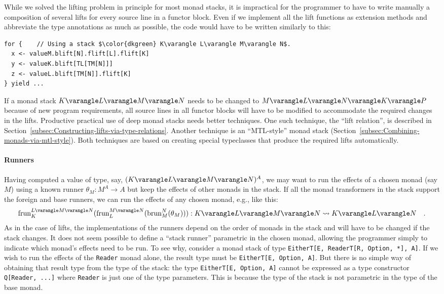While we solved the lifting problem in principle for most monad stacks,
it is impractical for the programmer to have to write manually a composition
of several lifts for every source line in a functor block. Even if
we implement all the lift functions as extension methods and abbreviate
the type annotations as much as possible, the code would have to be
written similarly to this:
\begin{lstlisting}[mathescape=true]
for {    // Using a stack $\color{dkgreen} K\varangle L\varangle M\varangle N$.
  x <- valueM.blift[N].flift[L].flift[K]
  y <- valueK.blift[TL[TM[N]]]
  z <- valueL.blift[TM[N]].flift[K]
} yield ...
\end{lstlisting}
If a monad stack $K\varangle L\varangle M\varangle N$ needs to be
changed to $M\varangle L\varangle N\varangle K\varangle P$ because
of new program requirements, all source lines in all functor blocks
will have to be modified to accommodate the required changes in the
lifts. Productive practical use of deep monad stacks needs better
techniques. One such technique, the \textsf{``}lift relation\textsf{''}, is described
in Section~\ref{subsec:Constructing-lifts-via-type-relations}. Another
technique is an \textsf{``}MTL-style\textsf{''} monad stack (Section~\ref{subsec:Combining-monads-via-mtl-style}).
Both techniques are based on creating special typeclasses that produce
the required lifts automatically.

\paragraph{Runners}

Having computed a value of type, say, $(K\varangle L\varangle M\varangle N)^{A}$,
we may want to run the effects of a chosen monad (say $M$) using
a known runner $\theta_{M}:M^{A}\rightarrow A$ but keep the effects
of other monads in the stack. If all the monad transformers in the
stack support the foreign and base runners, we can run the effects
of any chosen monad, e.g., like this:
\[
\text{frun}_{K}^{L\varangle M\varangle N}(\text{frun}_{L}^{M\varangle N}(\text{brun}_{M}^{N}(\theta_{M}))):K\varangle L\varangle M\varangle N\leadsto K\varangle L\varangle N\quad.
\]
As in the case of lifts, the implementations of the runners depend
on the order of monads in the stack and will have to be changed if
the stack changes. It does not seem possible to define a \textsf{``}stack
runner\textsf{''} parametric in the chosen monad, allowing the programmer
simply to indicate which monad\textsf{'}s effects need to be run. To see why,
consider a monad stack of type \lstinline!EitherT[E, ReaderT[R, Option, *], A]!.
If we wish to run the effects of the \lstinline!Reader! monad alone,
the result type must be \lstinline!EitherT[E, Option, A]!. But there
is no simple way of obtaining that result type from the type of the
stack: the type \lstinline!EitherT[E, Option, A]! cannot be expressed
as a type constructor \lstinline!Q[Reader, ...]! where \lstinline!Reader!
is just one of the type parameters. This is because the type of the
stack is not parametric in the type of the base monad.

